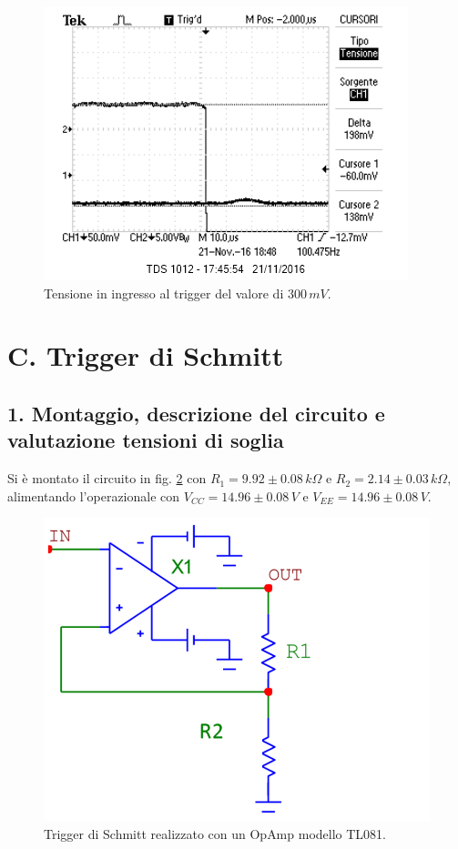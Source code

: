 \documentclass[10pt,a4paper]{article}
\begin{document}
\begin{figure}[htb!]
\centering
\includegraphics[scale=1.0]{immagini/morto.png}
\caption{Tensione in ingresso al trigger del valore di $300 \, mV$.}
\label{morto}
\end{figure}

\section*{C. Trigger di Schmitt}
\subsection{1. Montaggio, descrizione del circuito e valutazione tensioni di soglia}
Si è montato il circuito in fig. \ref{circuito3} con $R_1 = 9.92\pm0.08 \, k\Omega$ e $R_2 = 2.14 \pm 0.03 \, k\Omega$, alimentando l'operazionale con $V_{CC} = 14.96\pm0.08 \, V$ e $V_{EE} = 14.96 \pm 0.08 \, V$.\\

\begin{figure}[htb!]
\centering
\includegraphics[scale=0.5]{triggerSchmitt.png}
\caption{Trigger di Schmitt realizzato con un OpAmp modello TL081.\label{circuito3}}
\end{figure}
\end{document}
